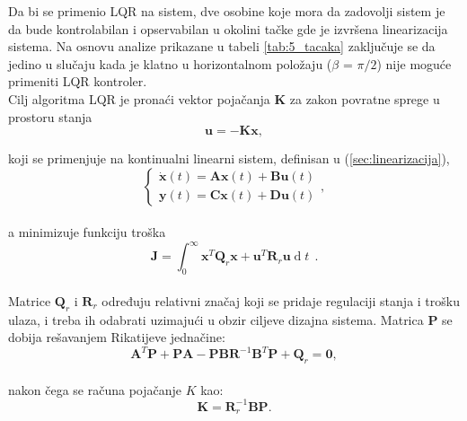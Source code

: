 \documentclass[a4paper,11pt]{article}
\theoremstyle{definition} \newtheorem{deff}{Definicija}[section]
\theoremstyle{definition} \newtheorem{prim}[deff]{Primer}
\theoremstyle{plain} \newtheorem{teor}[deff]{Teorema}
\newcommand{\vect}[1]{\boldsymbol{\mathbf{#1}}}
\begin{document}
	Da bi se primenio LQR na sistem, dve osobine koje mora da zadovolji sistem je da bude kontrolabilan i opservabilan u okolini tačke gde je izvršena linearizacija sistema. Na osnovu analize prikazane u tabeli \ref{tab:5_tacaka} zaključuje se da jedino u slučaju kada je klatno u horizontalnom položaju ($\beta$ = $\pi /2$) nije moguće primeniti LQR kontroler.\\
	
	
	Cilj algoritma LQR je pronaći vektor pojačanja $\vect{K}$ za zakon povratne sprege u prostoru stanja
	\begin{equation}
		\vect{u} = -\vect{K}\vect{x}, 
	\end{equation}
	
	koji se primenjuje na kontinualni linearni sistem, definisan u (\ref{sec:linearizacija}), \\
	
	\begin{equation}
		\begin{cases}
			\dot{\vect{x}}(t) = \vect{A}\vect{x}(t) + \vect{B}\vect{u}(t) \\
			\vect{y}(t) = \vect{C}\vect{x}(t) + \vect{D}\vect{u}(t)
		\end{cases}, 
	\end{equation}\\
	
	a minimizuje funkciju troška\\
	
	\begin{equation}
		\vect{J} = \int_{0}^{\infty}  \vect{x}^T \vect{Q}_r \vect{x}  + \vect{u}^T \vect{R}_r \vect{u} \operatorname{d}t~~.
	\end{equation} \\
	
	Matrice $\vect{Q}_r$ i $\vect{R}_r$ određuju relativni značaj koji se pridaje regulaciji stanja i trošku ulaza, i treba ih odabrati uzimajući u obzir ciljeve dizajna sistema. Matrica $\vect{P}$ se dobija rešavanjem Rikatijeve jednačine: \\
	\begin{equation}
		\vect{A}^T \vect{P} + \vect{P} \vect{A} - \vect{P} \vect{B} \vect{R}^{-1} \vect{B}^T \vect{P} + \vect{Q}_r = \vect{0}, 
	\end{equation} \\
	
	nakon čega se računa pojačanje $K$ kao:
	\begin{equation}
		\vect{K} = \vect{R}_r^{-1}\vect{B}\vect{P}.
	\end{equation}
	
\end{document}
